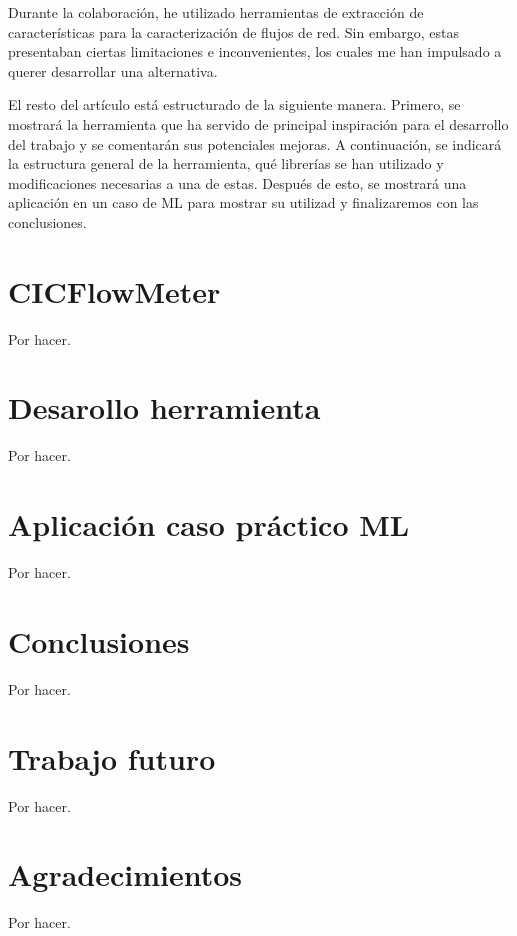 \documentclass[10pt,a4paper,twoside]{article}
\begin{document}
\begin{multicols}{2}
    Durante la colaboración, he utilizado herramientas de extracción de características para la caracterización de flujos de red. Sin embargo, estas presentaban ciertas limitaciones e inconvenientes, los cuales me han impulsado a querer desarrollar una alternativa.

    El resto del artículo está estructurado de la siguiente manera. Primero, se mostrará la herramienta que ha servido de principal inspiración para el desarrollo del trabajo y se comentarán sus potenciales mejoras. A continuación, se indicará la estructura general de la herramienta, qué librerías se han utilizado y modificaciones necesarias a una de estas. Después de esto, se mostrará una aplicación en un caso de ML para mostrar su utilizad y finalizaremos con las conclusiones.

    \section{CICFlowMeter}

    Por hacer. \cite{cicflowpost}

    \section{Desarollo herramienta}

    Por hacer.

    \section{Aplicación caso práctico ML}

    Por hacer.

    \section{Conclusiones}

    Por hacer.

    \section{Trabajo futuro}

    Por hacer.

    \section{Agradecimientos}

    Por hacer.

    

\end{multicols}
\end{document}
